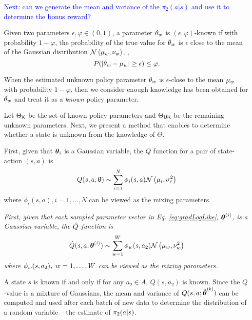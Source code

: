     \textcolor{blue}{Next: can we generate the mean and variance of the $\pi_2(a|s)$ and use it to determine the bonus reward?}

    \begin{definition}
        Given two parameters $\epsilon, \varphi \in (0,1)$, a parameter $\theta_{w}$ is $(\epsilon,
        \varphi)$-known if with probability $1-\varphi$, the probability of the true value for $\theta_{w}$ is
        $\epsilon$ close to the mean of the Gaussian distribution $\mathcal{N}\left(\mu_{w}, \nu_{w}\right)$, \ie,
        \[
        P(\lvert\theta_{w} - \mu_{w}\rvert \ge \epsilon) \le \varphi.
        \]
    \end{definition}
    When the estimated unknown policy parameter $\theta_{w}$ is $\epsilon$-close to the mean $\mu_{w}$ with
    probability $1-\varphi$, then we consider enough knowledge has been obtained for $\theta_{w}$ and treat it as a
    \emph{known} policy parameter.

    Let $\Theta_{\mathsf{K}}$ be the set of known policy parameters and $\Theta_{\mathsf{UK}}$ be the remaining unknown
    parameters.  Next, we present a method that enables to determine whether a state is unknown from the knowledge of
    $\Theta$.

    First, given that $\boldsymbol{\mathbb{\theta}}_i$ is a Gaussian variable, the $Q$ function for a pair of state-action $(s,a)$ is
    \[
    Q(s,a ;\uptheta) \sim \sum_{i=1}^N \phi_i(s,a) \mathcal{N}\left(\mu_i, \sigma_i^2\right)
    \]
    where $\phi_i(s,a),i=1,\ldots, N$ can be viewed as the mixing parameters.

    \emph{First, given that each sampled parameter vector in Eq. \ref{eq:gradLogLike}, $\boldsymbol{\mathbb{\theta}}^{(i)}$, is a Gaussian
          variable, the $\hat{Q}$-function is
          \[
          \hat{Q}(s,a ;\boldsymbol{\mathbb{\theta}}^{(i)}) \sim \sum_{w=1}^W \phi_{w}(s,a_2) \mathcal{N}\left(\mu_w, \nu_w^2\right)
          \]
          where $\phi_{w}(s,a_2),\ w=1,\ldots, W$ can be viewed as the mixing parameters. }

    A state $s$ is known if and only if for any $a_2 \in A$, $Q(s,a_2)$ is known. Since the $Q$-value is a mixture of
    Gaussians, the mean and variance of $Q(s,a;\hat{\boldsymbol{\mathbb{\theta}}}^{(b)})$ can be computed and used after each batch of
    new data to determine the distribution of a random variable -- the estimate of $\pi_{2}(a|s)$.

